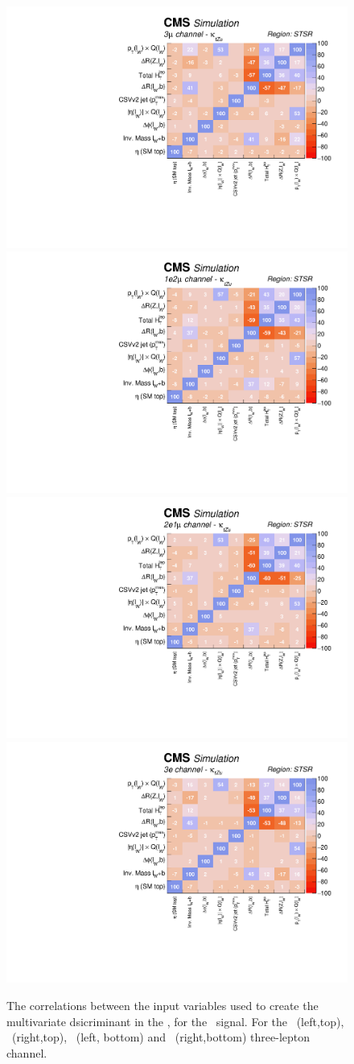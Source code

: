 \begin{figure}[htbp]
	\centering
	\includegraphics[width=0.49\linewidth]{6_Search/Figures/PlotsTechnics/correlationsigZutsingletopuuu}
	\includegraphics[width=0.49\linewidth]{6_Search/Figures/PlotsTechnics/correlationsigZutsingletopuue}
	\includegraphics[width=0.49\linewidth]{6_Search/Figures/PlotsTechnics/correlationsigZutsingletopeeu}
	\includegraphics[width=0.49\linewidth]{6_Search/Figures/PlotsTechnics/correlationsigZutsingletopeee}
	\caption{The correlations between the input variables used to create the multivariate dsicriminant in the \STSR, for the \Zut\ signal. For the \mumumu\ (left,top), \emumu\ (right,top), \eemu\ (left, bottom) and \eee\ (right,bottom) three-lepton channel.}
	\label{fig:correlationsigzutsingletop}
\end{figure}

